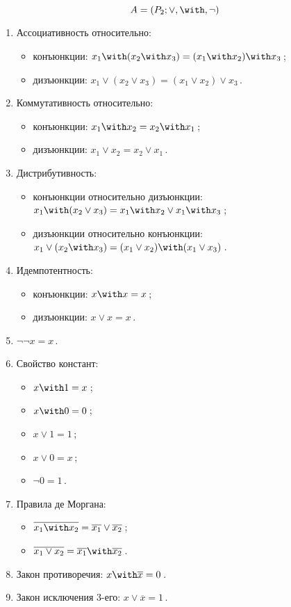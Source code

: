 \begin{defin}
  $$ 
  A = (P_2;\lor,\with,\lnot)
  $$
  \begin{enumerate}
  \item Ассоциативность относительно:
    \begin{itemize}
    \item конъюнкции: $x_1 \with (x_2 \with x_3) = (x_1 \with x_2)
\with x_3$\,;
    \item дизъюнкции: $x_1 \lor (x_2 \lor x_3) = (x_1 \lor x_2) \lor
x_3$\,.
    \end{itemize}
  \item Коммутативность относительно:
    \begin{itemize}
    \item конъюнкции: $x_1 \with x_2 = x_2 \with x_1$\,;
    \item дизъюнкции: $x_1 \lor x_2 = x_2 \lor x_1$\,.
    \end{itemize}
  \item Дистрибутивность:
    \begin{itemize}
    \item конъюнкции относительно дизъюнкции: $x_1 \with (x_2 \lor
x_3) = x_1 \with x_2 \lor x_1 \with x_3$\,;
    \item дизъюнкции относительно конъюнкции: $x_1 \lor (x_2 \with
x_3) = (x_1 \lor x_2) \with (x_1 \lor x_3)$\,.
    \end{itemize}
  \item Идемпотентность:
    \begin{itemize}
    \item конъюнкции: $x \with x = x$\,;
    \item дизъюнкции: $x \lor x = x$\,.
    \end{itemize}
  \item $\lnot\lnot x = x$\,.
  \item Свойство констант:
    \begin{itemize}
    \item $x \with 1 = x$\,;
    \item $x \with 0 = 0$\,;
    \item $x \lor 1 = 1$\,;
    \item $x \lor 0 = x$\,;
    \item $\lnot 0 = 1$\,.
    \end{itemize}
  \item Правила де Моргана:
    \begin{itemize}
    \item $\overline{x_1 \with x_2} = \overline{x_1} \lor
\overline{x_2}$\,;
    \item $\overline{x_1 \lor x_2} = \overline{x_1} \with
\overline{x_2}$\,.
    \end{itemize}
  \item Закон противоречия: $x \with \overline{x} = 0$\,.
  \item Закон исключения 3-его: $x \lor \overline{x} = 1$\,.
  \end{enumerate}
\end{defin}

